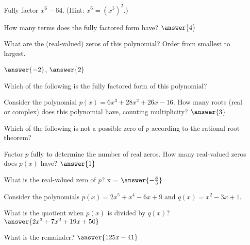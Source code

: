 \documentclass{ximera}
\begin{document}
\begin{problem}
    Fully factor $x^6 - 64$. (Hint: $x^6 = (x^3)^2$.)

    How many terms does the fully factored form have?  $\answer{4}$

    \begin{problem}
        What are the (real-valued) zeros of this polynomial? Order from smallest to largest.

        $\answer{-2}$, $\answer{2}$

        \begin{problem}
            Which of the following is the fully factored form of this polynomial?

            \begin{multipleChoice}
            \end{multipleChoice}
        \end{problem}
    \end{problem}
\end{problem}


\begin{problem}
    Consider the polynomial $p(x) = 6 x^3 + 28 x^2 + 26 x -16$.  How many roots (real or complex) does this polynomial have, counting multiplicity?  $\answer{3}$

    \begin{problem}
        Which of the following is not a possible zero of $p$ according to the rational root theorem?
        \begin{multipleChoice}
        \end{multipleChoice}
    \end{problem}

    \begin{problem}
        Factor $p$ fully to determine the number of real zeros.  How many real-valued zeros does $p(x)$ have?  $\answer{1}$

        \begin{problem}
            What is the real-valued zero of $p$?  x = $\answer{-\frac{8}{3}}$
        \end{problem}
    \end{problem}
\end{problem}

\begin{problem}
    Consider the polynomials $p(x) = 2x^5 + x^4 -6x+9$ and $q(x) = x^2-3x+1$.

    What is the quotient when $p(x)$ is divided by $q(x)$?  $\answer{2x^3+7x^2+19x+50}$

    What is the remainder?  $\answer{125x-41}$
\end{problem}
\end{document}

